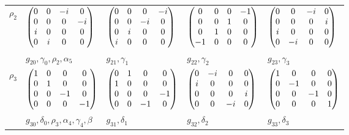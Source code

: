 \documentclass[10pt]{beamer}
\begin{document}
\begin{frame}[shrink=20]{}
\begin{table}[]
\begin{tabular}{l l  l  l  l }
\hline
$\rho_2$ &$\begin{pmatrix}0 & 0 & -i & 0\cr 0 & 0 & 0 & -i\cr i & 0 & 0 & 0\cr 0 & i & 0 & 0\end{pmatrix}$  
& $\begin{pmatrix}0 & 0 & 0 & -i\cr 0 & 0 & -i & 0\cr 0 & i & 0 & 0\cr i & 0 & 0 & 0\end{pmatrix}$ 
& $\begin{pmatrix}0 & 0 & 0 & -1\cr 0 & 0 & 1 & 0\cr 0 & 1 & 0 & 0\cr -1 & 0 & 0 & 0\end{pmatrix}$ 
& $\begin{pmatrix}0 & 0 & -i & 0\cr 0 & 0 & 0 & i\cr i & 0 & 0 & 0\cr 0 & -i & 0 & 0\end{pmatrix}$ \\
&  $g_{20}, \gamma_0, \rho_2, \alpha_5$ & $g_{21}, \gamma_1$  & $g_{22}, \gamma_2$ & $g_{23}, \gamma_3$ \\
\hline
$\rho_3$ &$\begin{pmatrix}1 & 0 & 0 & 0\cr 0 & 1 & 0 & 0\cr 0 & 0 & -1 & 0\cr 0 & 0 & 0 & -1\end{pmatrix}$  
& $\begin{pmatrix}0 & 1 & 0 & 0\cr 1 & 0 & 0 & 0\cr 0 & 0 & 0 & -1\cr 0 & 0 & -1 & 0\end{pmatrix}$ 
& $\begin{pmatrix}0 & -i & 0 & 0\cr i & 0 & 0 & 0\cr 0 & 0 & 0 & i\cr 0 & 0 & -i & 0\end{pmatrix}$ 
& $\begin{pmatrix}1 & 0 & 0 & 0\cr 0 & -1 & 0 & 0\cr 0 & 0 & -1 & 0\cr 0 & 0 & 0 & 1\end{pmatrix}$ \\
 & $g_{30}, \delta_0, \rho_3, \alpha_4, \gamma_4 , \beta$ & $g_{31}, \delta_1$  & $g_{32}, \delta_2$ & $g_{33}, \delta_3$ \\
\hline
\end{tabular}
\end{table}

\end{frame}
\end{document}
